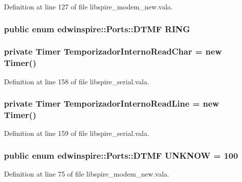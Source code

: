 Definition at line 127 of file libspire\-\_\-modem\-\_\-new.\-vala.

\hypertarget{namespaceedwinspire_1_1_ports_a8de2369866bdfd3f0663a793d0e67255}{
\subsubsection[{R\-I\-N\-G}]{\setlength{\rightskip}{0pt plus 5cm}public enum {\bf edwinspire\-::\-Ports\-::\-D\-T\-M\-F}
			 R\-I\-N\-G}}\label{namespaceedwinspire_1_1_ports_a8de2369866bdfd3f0663a793d0e67255}
\hypertarget{namespaceedwinspire_1_1_ports_a458f577133961caebcd35a6b1e7b9322}{
\subsubsection[{Temporizador\-Interno\-Read\-Char}]{\setlength{\rightskip}{0pt plus 5cm}private Timer Temporizador\-Interno\-Read\-Char = new Timer()}}\label{namespaceedwinspire_1_1_ports_a458f577133961caebcd35a6b1e7b9322}


Definition at line 158 of file libspire\-\_\-serial.\-vala.

\hypertarget{namespaceedwinspire_1_1_ports_afd9c83d6beca9151b46eff2c91bc90dc}{
\subsubsection[{Temporizador\-Interno\-Read\-Line}]{\setlength{\rightskip}{0pt plus 5cm}private Timer Temporizador\-Interno\-Read\-Line = new Timer()}}\label{namespaceedwinspire_1_1_ports_afd9c83d6beca9151b46eff2c91bc90dc}


Definition at line 159 of file libspire\-\_\-serial.\-vala.

\hypertarget{namespaceedwinspire_1_1_ports_a6d3970cfb8b14fc4c7c0682aefaecb11}{
\subsubsection[{U\-N\-K\-N\-O\-W}]{\setlength{\rightskip}{0pt plus 5cm}public enum {\bf edwinspire\-::\-Ports\-::\-D\-T\-M\-F} U\-N\-K\-N\-O\-W = 100}}\label{namespaceedwinspire_1_1_ports_a6d3970cfb8b14fc4c7c0682aefaecb11}


Definition at line 75 of file libspire\-\_\-modem\-\_\-new.\-vala.

